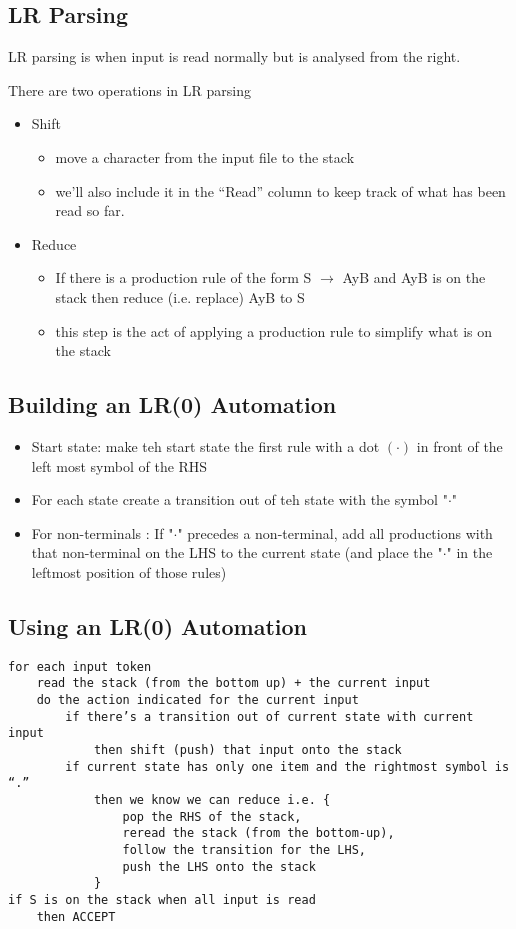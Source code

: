 \documentclass{article}
\begin{document}
\subsection*{LR Parsing}
LR parsing is when input is read normally but is analysed from the right. 

There are two operations in LR parsing 
\begin{itemize}
\item Shift 
\begin{itemize}
\item move a character from the input file to the stack
\item we’ll also include it in the “Read” column to keep track of
what has been read so far.
\end{itemize}
\item Reduce 
\begin{itemize}
\item If there is a production rule of the form S \(\rightarrow\) AyB and AyB is on
the stack then reduce (i.e. replace) AyB to S
\item this step is the act of applying a production rule to simplify
what is on the stack
\end{itemize}
\end{itemize}

\subsection*{Building an LR(0) Automation}
\begin{itemize}
\item Start state: make teh start state the first rule with a dot \((\cdot)\) in front of the left most symbol of the RHS
\item For each state create a transition out of teh state with the symbol "\(\cdot\)" 
\item For non-terminals : If "\(\cdot\)"  precedes a non-terminal, add all productions with that non-terminal on the LHS to the current state (and place the "\(\cdot\)"  in the leftmost position of those rules)
\end{itemize}

\subsection*{Using an LR(0) Automation}
\begin{lstlisting}
for each input token
	read the stack (from the bottom up) + the current input
	do the action indicated for the current input
		if there’s a transition out of current state with current input
			then shift (push) that input onto the stack
		if current state has only one item and the rightmost symbol is “.”
			then we know we can reduce i.e. {
				pop the RHS of the stack,
				reread the stack (from the bottom-up),
				follow the transition for the LHS,
				push the LHS onto the stack
			}
if S is on the stack when all input is read
	then ACCEPT
\end{lstlisting}
\end{document}

